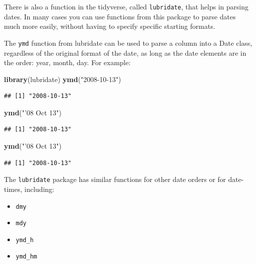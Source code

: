 \documentclass[]{book}
\makeatletter
\newenvironment{Shaded}{\begin{snugshade}}{\end{snugshade}}
\newcommand{\KeywordTok}[1]{\textcolor[rgb]{0.13,0.29,0.53}{\textbf{#1}}}
\newcommand{\StringTok}[1]{\textcolor[rgb]{0.31,0.60,0.02}{#1}}
\newcommand{\NormalTok}[1]{#1}
\providecommand{\tightlist}{%
  \setlength{\itemsep}{0pt}\setlength{\parskip}{0pt}}
\newenvironment{kframe}{%
\medskip{}
\setlength{\fboxsep}{.8em}
 \def\at@end@of@kframe{}%
 \ifinner\ifhmode%
  \def\at@end@of@kframe{\end{minipage}}%
  \begin{minipage}{\columnwidth}%
 \fi\fi%
 \def\FrameCommand##1{\hskip\@totalleftmargin \hskip-\fboxsep
 \colorbox{shadecolor}{##1}\hskip-\fboxsep
     \hskip-\linewidth \hskip-\@totalleftmargin \hskip\columnwidth}%
 \MakeFramed {\advance\hsize-\width
   \@totalleftmargin\z@ \linewidth\hsize
   \@setminipage}}%
 {\par\unskip\endMakeFramed%
 \at@end@of@kframe}
\renewenvironment{Shaded}{\begin{kframe}}{\end{kframe}}
\theoremstyle{definition}
\theoremstyle{definition}
\theoremstyle{definition}
\theoremstyle{remark}
\makeatother
\begin{document}
There is also a function in the tidyverse, called \texttt{lubridate},
that helps in parsing dates. In many cases you can use functions from
this package to parse dates much more easily, without having to specify
specific starting formats.

The \texttt{ymd} function from lubridate can be used to parse a column
into a Date class, regardless of the original format of the date, as
long as the date elements are in the order: year, month, day. For
example:

\begin{Shaded}
\begin{Highlighting}[]
\KeywordTok{library}\NormalTok{(lubridate)}
\KeywordTok{ymd}\NormalTok{(}\StringTok{"2008-10-13"}\NormalTok{)}
\end{Highlighting}
\end{Shaded}

\begin{verbatim}
## [1] "2008-10-13"
\end{verbatim}

\begin{Shaded}
\begin{Highlighting}[]
\KeywordTok{ymd}\NormalTok{(}\StringTok{"'08 Oct 13"}\NormalTok{)}
\end{Highlighting}
\end{Shaded}

\begin{verbatim}
## [1] "2008-10-13"
\end{verbatim}

\begin{Shaded}
\begin{Highlighting}[]
\KeywordTok{ymd}\NormalTok{(}\StringTok{"'08 Oct 13"}\NormalTok{)}
\end{Highlighting}
\end{Shaded}

\begin{verbatim}
## [1] "2008-10-13"
\end{verbatim}

The \texttt{lubridate} package has similar functions for other date
orders or for date-times, including:

\begin{itemize}
\tightlist
\item
  \texttt{dmy}
\item
  \texttt{mdy}
\item
  \texttt{ymd\_h}
\item
  \texttt{ymd\_hm}
\end{itemize}
\end{document}
